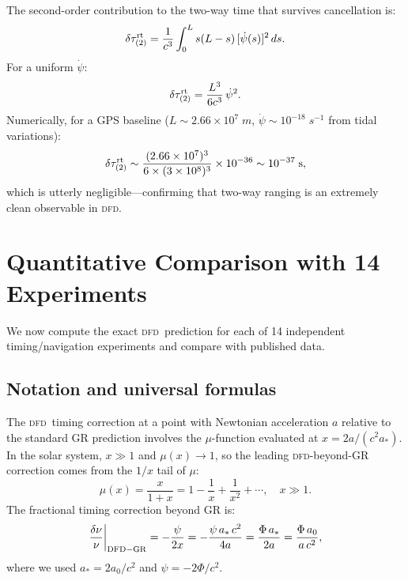 \documentclass[aps,prd,twocolumn,superscriptaddress,nofootinbib,longbibliography]{revtex4-2}
\newcommand{\DFD}{\textsc{dfd}}
\newcommand{\astar}{a_*}
\begin{document}
The second-order contribution to the two-way time that survives cancellation is:
\begin{equation}\label{eq:residual-2nd}
\delta\tau^{\rm rt}_{(2)} = \frac{1}{c^3}\int_0^L s(L-s)\,[\dot{\psi}(s)]^2\,ds.
\end{equation}
For a uniform $\dot{\psi}$:
\begin{equation}\label{eq:residual-uniform}
\delta\tau^{\rm rt}_{(2)} = \frac{L^3}{6c^3}\,\dot{\psi}^2.
\end{equation}
Numerically, for a GPS baseline ($L \sim 2.66\times10^7\;\si{m}$,
$\dot{\psi} \sim 10^{-18}\;\si{s^{-1}}$ from tidal variations):
\begin{equation}
\delta\tau^{\rm rt}_{(2)} \sim \frac{(2.66\times10^7)^3}{6\times(3\times10^8)^3}
\times 10^{-36} \sim 10^{-37}\;\si{s},
\end{equation}
which is utterly negligible---confirming that two-way ranging is an extremely
clean observable in \DFD.

\section{Quantitative Comparison with 14 Experiments}\label{sec:experiments}

We now compute the exact \DFD\ prediction for each of 14 independent
timing/navigation experiments and compare with published data.

\subsection{Notation and universal formulas}\label{sec:notation}

The \DFD\ timing correction at a point with Newtonian acceleration $a$
relative to the standard GR prediction involves the $\mu$-function
evaluated at $x = 2a/(c^2 \astar)$. In the solar system,
$x \gg 1$ and $\mu(x) \to 1$, so the leading \DFD-beyond-GR correction
comes from the $1/x$ tail of $\mu$:
\begin{equation}\label{eq:mu-correction}
\mu(x) = \frac{x}{1+x} = 1 - \frac{1}{x} + \frac{1}{x^2} + \cdots,
\quad x \gg 1.
\end{equation}
The fractional timing correction beyond GR is:
\begin{equation}\label{eq:delta-f-general}
\frac{\delta\nu}{\nu}\bigg|_{\rm DFD-GR} = -\frac{\psi}{2x}
= -\frac{\psi\,\astar\,c^2}{4a}
= \frac{\Phi\,\astar}{2a}
= \frac{\Phi\,a_0}{a\,c^2},
\end{equation}
where we used $\astar = 2a_0/c^2$ and $\psi = -2\Phi/c^2$.
\end{document}
